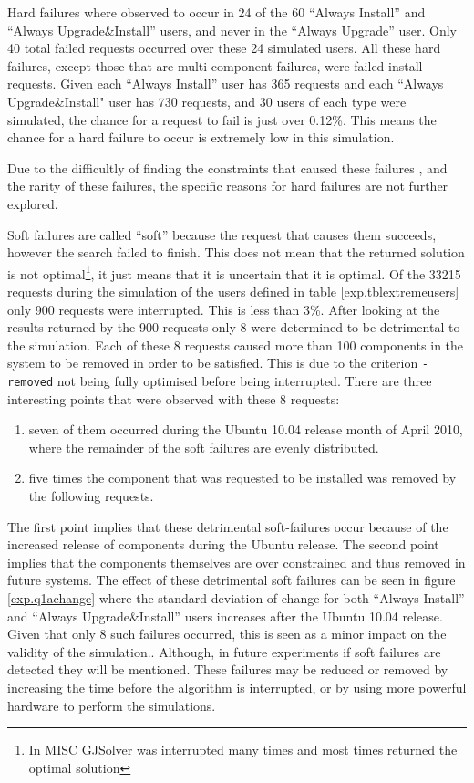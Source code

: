 Hard failures where observed to occur in 24 of the 60 ``Always Install'' and ``Always Upgrade\&Install'' users, and never in the ``Always Upgrade'' user.
Only 40 total failed requests occurred over these 24 simulated users.
All these hard failures, except those that are multi-component failures, were failed install requests.
Given each ``Always Install'' user has 365 requests and each ``Always Upgrade\&Install" user has 730 requests, 
and 30 users of each type were simulated, the chance for a request to fail is just over 0.12\%.
This means the chance for a hard failure to occur is extremely low in this simulation.

Due to the difficultly of finding the constraints that caused these failures \citep{quickxplain},
and the rarity of these failures, the specific reasons for hard failures are not further explored.

Soft failures are called ``soft'' because the request that causes them succeeds, however the search failed to finish.
This does not mean that the returned solution is not optimal\footnote{In MISC GJSolver was interrupted many times and most times returned the optimal solution},
it just means that it is uncertain that it is optimal.
Of the 33215 requests during the simulation of the users defined in table \ref{exp.tblextremeusers} only 900 requests were interrupted.
This is less than 3\%.
After looking at the results returned by the 900 requests only 8 were determined to be detrimental to the simulation.
Each of these 8 requests caused more than 100 components in the system to be removed in order to be satisfied.
This is due to the criterion \texttt{-removed} not being fully optimised before being interrupted.
There are three interesting points that were observed with these 8 requests:
\begin{enumerate}
  \item seven of them occurred during the Ubuntu 10.04 release month of April 2010, where the remainder of the soft failures are evenly distributed.
  \item five times the component that was requested to be installed was removed by the following requests.
\end{enumerate}
The first point implies that these detrimental soft-failures occur because of the increased release of components during the Ubuntu release.
The second point implies that the components themselves are over constrained and thus removed in future systems.
The effect of these detrimental soft failures can be seen in figure \ref{exp.q1achange} 
where the standard deviation of change for both ``Always Install'' and ``Always Upgrade\&Install'' users increases after the Ubuntu 10.04 release.
Given that only 8 such failures occurred, this is seen as a minor impact on the validity of the simulation..
Although, in future experiments if soft failures are detected they will be mentioned. 
These failures may be reduced or removed by increasing the time before the algorithm is interrupted, or by using more powerful hardware to perform the simulations.

